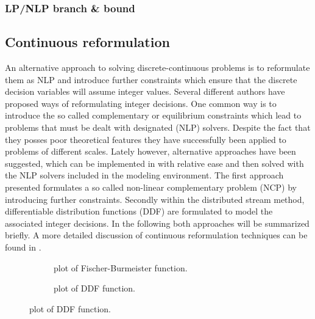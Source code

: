        \subsubsection{LP/NLP branch \& bound}



    \subsection{Continuous reformulation}
    \label{sec:opt:theory:continuous}
    An alternative approach to solving discrete-continuous problems is to reformulate them as NLP
    and introduce further constraints which ensure that the discrete decision variables will assume integer values.
    Several different authors have proposed ways of reformulating integer decisions. One common way is to introduce 
    the so called complementary or equilibrium constraints which lead to problems that must be dealt with designated 
    (NLP) solvers. Despite the fact that they posses poor theoretical features they have successfully been applied
    to problems of different scales. Lately however, alternative approaches have been suggested, which can be implemented 
    in \gproms with relative ease and then solved with the NLP solvers included in the modeling environment. 
    The first approach presented formulates a so called non-linear complementary problem (NCP) by introducing 
    further constraints. Secondly within the distributed stream method, differentiable distribution functions (DDF)
    are formulated to model the associated integer decisions. In the following both approaches will be summarized briefly. 
    A more detailed discussion of continuous reformulation techniques can be found in \cite{Stein.2004}. 
    \begin{figure}
        \scriptsize
        \center
        \begin{subfigure}{0.48\textwidth}
            
            \caption{plot of Fischer-Burmeister function.}
            \label{fig:FB_plot}
        \end{subfigure}
            \begin{subfigure}{0.48\textwidth}
            
            \caption{plot of DDF function.}
            \label{fig:DDF_plot}
        \end{subfigure}
    \end{figure}
    
